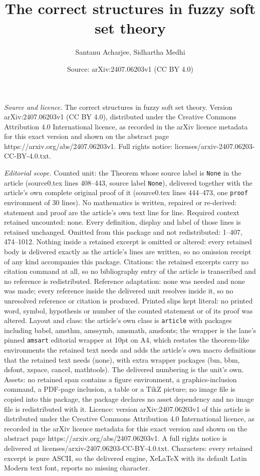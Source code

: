 \documentclass[10pt,a4paper]{amsart}
\title[The correct structures in fuzzy soft set theory]{The correct structures in fuzzy soft set theory}
\author{Santanu Acharjee, Sidhartha Medhi}
\date{Source: arXiv:2407.06203v1 (CC BY 4.0)}
\begin{document}
\maketitle

\noindent\emph{Source and licence.} The correct structures in fuzzy soft set theory. Version arXiv:2407.06203v1 (CC BY 4.0), distributed under the Creative Commons Attribution 4.0 International licence, as recorded in the arXiv licence metadata for this exact version and shown on the abstract page https://arxiv.org/abs/2407.06203v1. Full rights notice: licenses/arxiv-2407.06203-CC-BY-4.0.txt.\par\smallskip

\noindent\textit{Editorial scope.} Counted unit: the Theorem whose source label is \texttt{None} in the article (source0.tex lines 408--443, source label \texttt{None}), delivered together with the article's own complete original proof of it (source0.tex lines 444--473, one \texttt{proof} environment of 30 lines). No mathematics is written, repaired or re-derived: statement and proof are the article's own text line for line. Required context retained uncounted: none. Every definition, display and label of those lines is retained unchanged. Omitted from this package and not redistributed: 1--407, 474--1012. Nothing inside a retained excerpt is omitted or altered: every retained body is delivered exactly as the article's lines are written, so no omission receipt of any kind accompanies this package. Citations: the retained excerpts carry no citation command at all, so no bibliography entry of the article is transcribed and no reference is redistributed. Reference adaptation: none was needed and none was made; every reference inside the delivered unit resolves inside it, so no unresolved reference or citation is produced. Printed slips kept literal: no printed word, symbol, hypothesis or number of the counted statement or of its proof was altered. Layout and class: the article's own class is \texttt{article} with packages including babel, amsthm, amssymb, amsmath, amsfonts; the wrapper is the lane's pinned \texttt{amsart} editorial wrapper at 10pt on A4, which restates the theorem-like environments the retained text needs and adds the article's own macro definitions that the retained text needs (none), with extra wrapper packages (bm, bbm, dsfont, xspace, cancel, mathtools). The delivered numbering is the unit's own. Assets: no retained span contains a figure environment, a graphics-inclusion command, a PDF-page inclusion, a table or a TikZ picture; no image file is copied into this package, the package declares no asset dependency and no image file is redistributed with it. Licence: version arXiv:2407.06203v1 of this article is distributed under the Creative Commons Attribution 4.0 International licence, as recorded in the arXiv licence metadata for this exact version and shown on the abstract page https://arxiv.org/abs/2407.06203v1. A full rights notice is delivered at licenses/arxiv-2407.06203-CC-BY-4.0.txt. Characters: every retained excerpt is pure ASCII, so the delivered engine, XeLaTeX with its default Latin Modern text font, reports no missing character.
\end{document}
